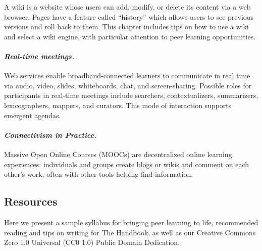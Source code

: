 A wiki is a website whose users can add, modify, or delete its content
via a web browser. Pages have a feature called ``history'' which allows
users to see previous versions and roll back to them. This chapter
includes tips on how to use a wiki and select a wiki engine, with
particular attention to peer learning opportunities.

\hypertarget{real-time-meetings.}{%
\paragraph{\texorpdfstring{\emph{Real-time
meetings.}}{Real-time meetings.}}\label{real-time-meetings.}}

Web services enable broadband-connected learners to communicate in real
time via audio, video, slides, whiteboards, chat, and screen-sharing.
Possible roles for participants in real-time meetings include searchers,
contextualizers, summarizers, lexicographers, mappers, and curators.
This mode of interaction supports emergent agendas.

\hypertarget{connectivism-in-practice.}{%
\paragraph{\texorpdfstring{\emph{Connectivism in
Practice.}}{Connectivism in Practice.}}\label{connectivism-in-practice.}}

Massive Open Online Courses (MOOCs) are decentralized online learning
experiences: individuals and groups create blogs or wikis and comment on
each other's work, often with other tools helping find information.

\hypertarget{resources}{%
\subsection{Resources}\label{resources}}

Here we present a sample syllabus for bringing peer learning to life,
recommended reading and tips on writing for The Handbook, as well as our
Creative Commons Zero 1.0 Universal (CC0 1.0) Public Domain Dedication.

